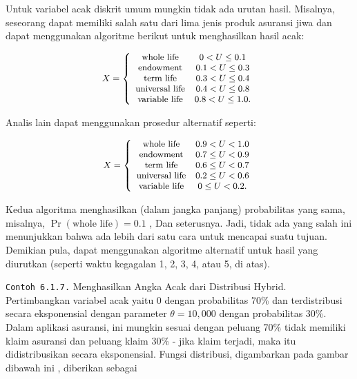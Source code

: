 \documentclass[
]{book}
\begin{document}
Untuk variabel acak diskrit umum mungkin tidak ada urutan hasil. Misalnya, seseorang dapat memiliki salah satu dari lima jenis produk asuransi jiwa dan dapat menggunakan algoritme berikut untuk menghasilkan hasil acak:

\[{\small
\begin{aligned}
X = \left\{ \begin{array}{cc}
  \textrm{whole life} &   0<U  \leq 0.1  \\
 \textrm{endowment} &  0.1 < U  \leq  0.3\\
\textrm{term life} &  0.3 < U  \leq  0.4\\
  \textrm{universal life} &  0.4 < U  \leq  0.8  \\
  \textrm{variable life} &  0.8 < U  \leq  1.0 .
            \end{array} \right.
\end{aligned}
}\]

Analis lain dapat menggunakan prosedur alternatif seperti:

\[{\small
\begin{aligned}
X = \left\{ \begin{array}{cc}
  \textrm{whole life} &   0.9<U<1.0  \\
 \textrm{endowment} &  0.7 \leq U < 0.9\\
\textrm{term life} &  0.6 \leq U < 0.7\\
  \textrm{universal life} &  0.2 \leq U < 0.6  \\
  \textrm{variable life} &  0 \leq U < 0.2 .
            \end{array} \right.
\end{aligned}
}\]

Kedua algoritma menghasilkan (dalam jangka panjang) probabilitas yang sama, misalnya, \(\Pr(\textrm{whole life})=0.1\) , Dan seterusnya. Jadi, tidak ada yang salah ini menunjukkan bahwa ada lebih dari satu cara untuk mencapai suatu tujuan. Demikian pula, dapat menggunakan algoritme alternatif untuk hasil yang diurutkan (seperti waktu kegagalan 1, 2, 3, 4, atau 5, di atas).

\texttt{Contoh\ 6.1.7.} Menghasilkan Angka Acak dari Distribusi Hybrid. Pertimbangkan variabel acak yaitu 0 dengan probabilitas 70\% dan terdistribusi secara eksponensial dengan parameter \(\theta= 10,000\) dengan probabilitas 30\%. Dalam aplikasi asuransi, ini mungkin sesuai dengan peluang 70\% tidak memiliki klaim asuransi dan peluang klaim 30\% - jika klaim terjadi, maka itu didistribusikan secara eksponensial. Fungsi distribusi, digambarkan pada gambar dibawah ini , diberikan sebagai
\end{document}
